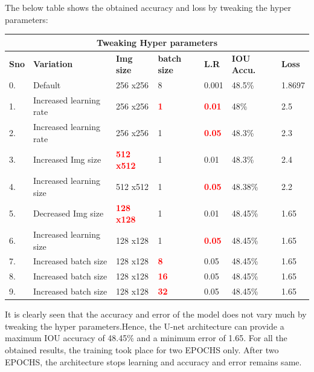 \documentclass{IEEEtran}
\begin{document}
The below table shows the obtained accuracy and loss by tweaking the hyper parameters:

\begin{tabular}{ |p{0.6cm}|p{1.2cm}|p{0.6cm}|p{0.6cm}|p{0.6cm}|p{0.8cm}|p{0.8cm}|}
 \hline
 \multicolumn{7}{|c|}{\textbf{Tweaking Hyper parameters}} \\
 \hline
 \textbf{Sno} & \textbf{Variation} & \textbf{Img size} & \textbf{batch size} & \textbf{L.R} & \textbf{IOU Accu.} & \textbf{Loss} \\
 \hline
 0. & Default   & 256 x256    & 8  & 0.001 & 48.5\% & 1.8697 \\
 \hline
 1. & Increased learning rate   & 256 x256    & \textcolor{red}{\textbf{1}}  & \textcolor{red}{\textbf{0.01}} & 48\% & 2.5 \\
 \hline
 2. & Increased learning rate   & 256 x256    & 1  & \textcolor{red}{\textbf{0.05}} & 48.3\% & 2.3 \\
 \hline
 3. & Increased Img size   & \textcolor{red}{\textbf{512 x512}}    & 1  & 0.01 & 48.3\% & 2.4 \\
 \hline
 4. & Increased learning size   & 512 x512    & 1  & \textcolor{red}{\textbf{0.05}} & 48.38\% & 2.2 \\
 \hline
 5. & Decreased Img size   & \textcolor{red}{\textbf{128 x128}}    & 1  & 0.01 & 48.45\% & 1.65 \\
 \hline
 6. & Increased learning size   & 128 x128    & 1  & \textcolor{red}{\textbf{0.05}} & 48.45\% & 1.65 \\
 \hline
 7. & Increased batch size   & 128 x128    & \textcolor{red}{\textbf{8}}  & 0.05 & 48.45\% & 1.65 \\
 \hline
 8. & Increased batch size   & 128 x128    & \textcolor{red}{\textbf{16}}  & 0.05 & 48.45\% & 1.65 \\
 \hline
 9. & Increased batch size   & 128 x128    & \textcolor{red}{\textbf{32}}  & 0.05 & 48.45\% & 1.65 \\
 \hline
\end{tabular}
\newline

It is clearly seen that the accuracy and error of the model does not vary much by tweaking the hyper parameters.Hence, the U-net architecture can provide a maximum IOU accuracy of 48.45\% and a minimum error of 1.65. For all the obtained results, the training took place for two EPOCHS only. After two EPOCHS, the architecture stops learning and accuracy and error remains same.
\end{document}
